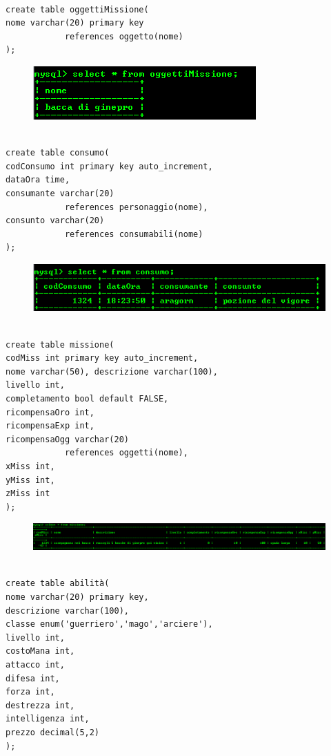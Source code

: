 \begin{verbatim}

create table oggettiMissione( 
nome varchar(20) primary key 
			references oggetto(nome)
);
\end{verbatim}

\begin{figure}[H]
\centering
\includegraphics[width=0.7\linewidth]{immagini/10}
\caption{}
\label{fig:1}
\end{figure}

\begin{verbatim}

create table consumo( 
codConsumo int primary key auto_increment, 
dataOra time, 
consumante varchar(20) 
			references personaggio(nome), 
consunto varchar(20) 
			references consumabili(nome)
);
\end{verbatim}

\begin{figure}[H]
\centering
\includegraphics[width=0.7\linewidth]{immagini/11}
\caption{}
\label{fig:1}
\end{figure}

\begin{verbatim}

create table missione( 
codMiss int primary key auto_increment, 
nome varchar(50), descrizione varchar(100), 
livello int, 
completamento bool default FALSE, 
ricompensaOro int, 
ricompensaExp int, 
ricompensaOgg varchar(20) 
			references oggetti(nome), 
xMiss int, 
yMiss int, 
zMiss int
);
\end{verbatim}

\begin{figure}[H]
\centering
\includegraphics[width=0.7\linewidth]{immagini/12}
\caption{}
\label{fig:1}
\end{figure}

\begin{verbatim}

create table abilità( 
nome varchar(20) primary key, 
descrizione varchar(100),
classe enum('guerriero','mago','arciere'), 
livello int, 
costoMana int, 
attacco int, 
difesa int, 
forza int, 
destrezza int, 
intelligenza int, 
prezzo decimal(5,2)
);
\end{verbatim}

